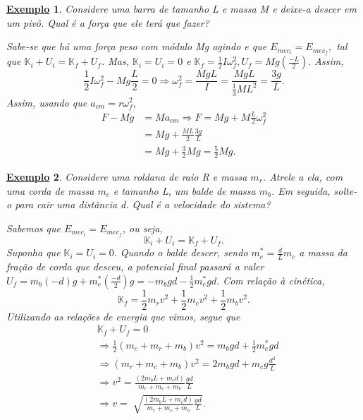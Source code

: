 \documentclass{article}
\newtheorem{example}{\underline{Exemplo}}
\begin{document}
\begin{example}
  Considere uma barra de tamanho L e massa M e deixe-a descer em um pivô. Qual é a força que ele terá que fazer?

  Sabe-se que há uma força peso com módulo Mg agindo e que \(E_{mec_{i}} = E_{mec_{f}},\) tal que \(\mathbb{K}_{i} + U_{i} = \mathbb{K}_{f} + U_{f}\).
  Mas, \(\mathbb{K}_{i} = U_{i} = 0\) e \(\mathbb{K}_{f} = \frac{1}{2}I\omega_{f}^{2}, U_{f} = Mg(\frac{-L}{2}).\) Assim, 
  \[
    \frac{1}{2}I\omega_{f}^{2} - Mg \frac{L}{2} = 0 \Rightarrow \omega_{f}^{2} = \frac{MgL}{I} = \frac{MgL}{\frac{1}{3}ML^{2}} = \frac{3g}{L}.
  \]
  Assim, usando que \(a_{cm} = r\omega_{f}^{2},\)
  \begin{align*}
    F- Mg &= Ma_{cm} \Rightarrow F = Mg + M \frac{L}{2}\omega_{f}^{2}\\
          &= Mg + \frac{ML}{2}\frac{3g}{L}\\
          &=Mg + \frac{3}{2}Mg = \frac{5}{2}Mg.
  \end{align*}
\end{example}
\begin{example}
  Considere uma roldana de raio R e massa \(m_{r}\). Atrele a ela, com uma corda de massa \(m_{c}\) e tamanho L, um balde de massa \(m_{b}\). 
  Em seguida, solte-o para cair uma distância d. Qual é a velocidade do sistema?

  Sabemos que \(E_{mec_i} = E_{mec_f}\), ou seja, 
  \[
    \mathbb{K}_{i} + U_{i} = \mathbb{K}_{f} + U_{f}.
  \]
  Suponha que \(\mathbb{K}_{i} = U_{i} = 0.\) Quando o balde descer, sendo \(m_{c}^{*} = \frac{d}{L}m_{c}\) a massa da fração de corda que desceu, a potencial final passará a valer
  \(U_{f} = m_{b}(-d)g + m_{c}^{*}(\frac{-d}{2})g = -m_{b}gd - \frac{1}{2}m_{c}^{*}gd.\) Com relação à cinética, 
  \[
    \mathbb{K}_{f} = \frac{1}{2}m_{r}v^{2} + \frac{1}{2}m_{c}v^{2} + \frac{1}{2}m_{b}v^{2}.
  \]
  Utilizando as relações de energia que vimos, segue que 
  \begin{align*}
    &\mathbb{K}_{f} + U_{f} = 0\\
    &\Rightarrow \frac{1}{2}(m_{c}+m_{r}+m_{b})v^{2} = m_{b}gd + \frac{1}{2}m_{c}^{*}gd\\
    &\Rightarrow (m_{r}+m_{c}+m_{b})v^{2} = 2m_{b}gd + m_{c}g \frac{d^{2}}{L}\\
    &\Rightarrow v^{2} = \frac{(2m_{b}L + m_{c}d)}{m_{r}+m_{c}+m_{b}}\frac{gd}{L}\\
    &\Rightarrow v = \sqrt[]{\frac{(2m_{b}L + m_{c}d)}{m_{r}+m_{c}+m_{b}}\frac{gd}{L}}.
  \end{align*}
\end{example}
\newpage
\end{document}
